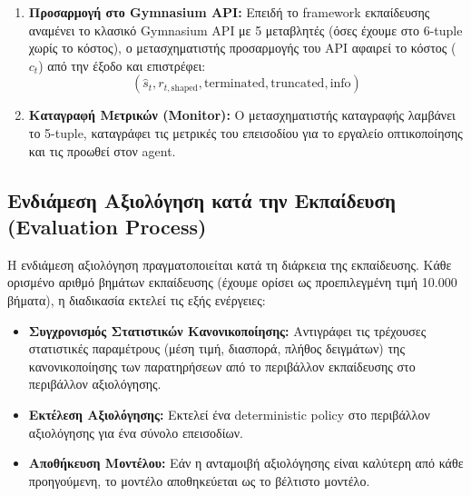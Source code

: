 \documentclass[acmsmall,screen,nonacm]{acmart}
\begin{document}
\begin{enumerate}
		\item \textbf{Προσαρμογή στο Gymnasium API:} Επειδή το framework εκπαίδευσης αναμένει το κλασικό Gymnasium API με 5 μεταβλητές (όσες έχουμε στο 6-tuple χωρίς το κόστος), ο μετασχηματιστής προσαρμογής του API αφαιρεί το κόστος ($c_t$) από την έξοδο και επιστρέφει:
		\begin{equation}
			(\hat{s}_t, r_{t,\text{shaped}}, \text{terminated}, \text{truncated}, \text{info})
		\end{equation}
		\item \textbf{Καταγραφή Μετρικών (Monitor):} Ο μετασχηματιστής καταγραφής λαμβάνει το 5-tuple, καταγράφει τις μετρικές του επεισοδίου για το εργαλείο οπτικοποίησης και τις προωθεί στον agent.
	\end{enumerate}

	\subsection{Ενδιάμεση Αξιολόγηση κατά την Εκπαίδευση (Evaluation Process)}
	Η ενδιάμεση αξιολόγηση πραγματοποιείται κατά τη διάρκεια της εκπαίδευσης. Κάθε ορισμένο αριθμό βημάτων εκπαίδευσης (έχουμε ορίσει ως προεπιλεγμένη τιμή 10.000 βήματα), η διαδικασία εκτελεί τις εξής ενέργειες:
	\begin{itemize}
		\item \textbf{Συγχρονισμός Στατιστικών Κανονικοποίησης:} Αντιγράφει τις τρέχουσες στατιστικές παραμέτρους (μέση τιμή, διασπορά, πλήθος δειγμάτων) της κανονικοποίησης των παρατηρήσεων από το περιβάλλον εκπαίδευσης στο περιβάλλον αξιολόγησης. 
		\item \textbf{Εκτέλεση Αξιολόγησης:} Εκτελεί ένα deterministic policy στο περιβάλλον αξιολόγησης για ένα σύνολο επεισοδίων.
		\item \textbf{Αποθήκευση Μοντέλου:} Εάν η ανταμοιβή αξιολόγησης είναι καλύτερη από κάθε προηγούμενη, το μοντέλο αποθηκεύεται ως το βέλτιστο μοντέλο.
	\end{itemize}
\end{document}

